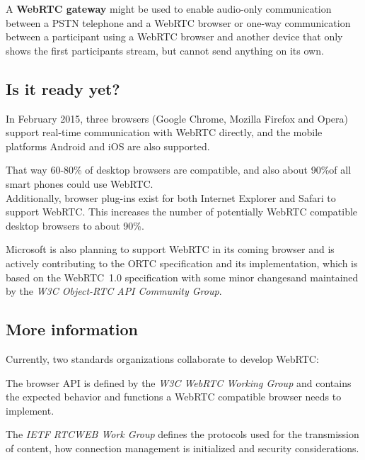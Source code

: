 \documentclass[../../../thesis.tex]{subfiles}
\begin{document}
A \textbf{WebRTC gateway} might be used to enable audio-only communication between a PSTN telephone and a WebRTC browser or one-way communication between a participant using a WebRTC browser and another device that only shows the first participants stream, but cannot send anything on its own.

\subsection{Is it ready yet?}
In February 2015, three browsers (Google Chrome, Mozilla Firefox and Opera) support real-time communication with WebRTC directly, and the mobile platforms Android and iOS are also supported.\par
That way 60-80\% of desktop browsers\footnotemark
are compatible, and also about 90\%\footnotemark of all smart phones could use WebRTC.\\

Additionally, browser plug-ins exist for both Internet Explorer and Safari to support \mbox{WebRTC\footnotemark}. This increases the number of potentially WebRTC compatible desktop browsers to about 90\%.\par


Microsoft is also planning to support WebRTC in its coming browser and is actively contributing to the ORTC\cite{ortc} specification\cite{ortc-api} and its implementation, which is based on the \mbox{WebRTC 1.0} specification\cite{webrtc-1.0} with some minor changes\footnotemark and maintained by the \emph{W3C Object-RTC API Community Group}.



\subsection{More information}
Currently, two standards organizations collaborate to develop WebRTC:\par
The browser API\cite{webrtc-1.0} is defined by the \emph{W3C WebRTC Working Group} and contains the expected behavior and functions a WebRTC compatible browser needs to implement.\par
The \emph{IETF RTCWEB Work Group} defines the protocols used for the transmission of content, how connection management is initialized and security considerations\cite{ietf-rtcweb-overview}.\\

\end{document}
